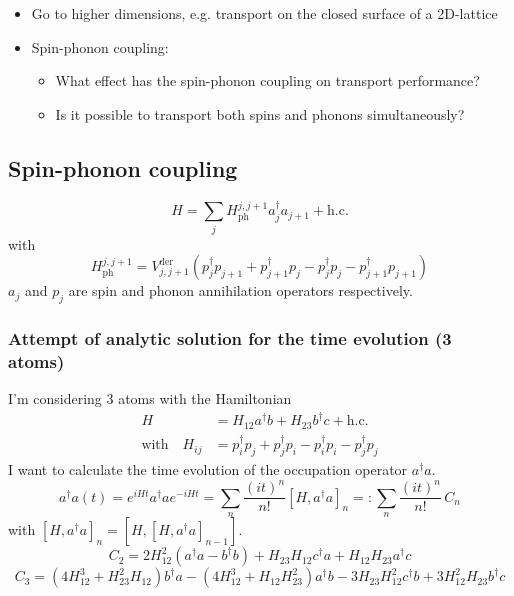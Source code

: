 \begin{itemize}
\item Go to higher dimensions, e.g. transport on the closed surface of a 2D-lattice
\item Spin-phonon coupling:%
\begin{itemize}
\item What effect has the spin-phonon coupling on transport performance?
\item Is it possible to transport both spins and phonons simultaneously?
\end{itemize}
\end{itemize}
\newpage
\subsection*{Spin-phonon coupling} 
$$H=\sum_j H_\text{ph}^{j,j+1} a_j^\dagger a_{j+1} + \text{h.c.}$$
with 
$$H_\text{ph}^{j,j+1}=V_{j,j+1}^\text{der}\left(p_j^\dagger p_{j+1}+p_{j+1}^\dagger p_{j}-p_{j}^\dagger p_{j}-p_{j+1}^\dagger p_{j+1}\right)$$
$a_j$ and $p_j$ are spin and phonon annihilation operators respectively.
\subsubsection*{Attempt of analytic solution for the time evolution (3 atoms)}
I'm considering 3 atoms with the Hamiltonian 
\begin{align*}
H&=H_{12}a^\dagger b+H_{23}b^\dagger c +\text{h.c.}\\
\text{with}\quad H_{ij}&=p_i^\dagger p_{j}+p_{j}^\dagger p_{i}-p_{i}^\dagger p_{i}-p_{j}^\dagger p_{j}
\end{align*}
I want to calculate the time evolution of the occupation operator $a^\dagger a$.
$$a^\dagger a(t) = e^{iHt}a^\dagger a e^{-iHt}=\sum_n\frac{(it)^n}{n!} [H,a^\dagger a]_n=:\sum_n\frac{(it)^n}{n!}\,C_n$$
with $[H,a^\dagger a]_n = [H,[H,a^\dagger a]_{n-1}]$.
$$C_2 = 2 H_{12}^2 (a^\dagger a - b^\dagger b) + H_{23} H_{12} c^\dagger a + H_{12} H_{23} a^\dagger c $$ $$C_3 = (4 H_{12}^3 + H_{23}^2 H_{12}) b^\dagger a - (4 H_{12}^3 + H_{12} H_{23}^2) a^\dagger b - 3 H_{23} H_{12}^2 c^\dagger b + 3 H_{12}^2 H_{23} b^\dagger c $$

